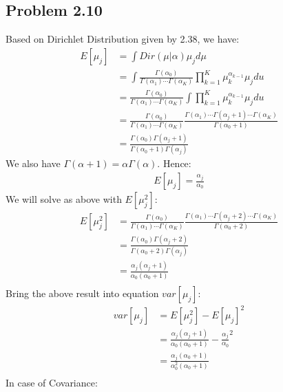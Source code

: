 \documentclass[12pt]{article}
\begin{document}
    \subsection*{Problem 2.10}
    Based on Dirichlet Distribution given by 2.38, we have:
    \begin{align*}
        E[\mu_j] & = \int{Dir(\mu|\alpha)\mu_j}d\mu \\
        & = \int{\frac{\Gamma(\alpha_0)}{\Gamma(\alpha_1)\cdots\Gamma(\alpha_K)}\prod_{k = 1}^{K}\mu_{k}^{\alpha_{k-1}}\mu_jdu} \\
        & = \frac{\Gamma(\alpha_0)}{\Gamma(\alpha_1)\cdots\Gamma(\alpha_K)}\int{\prod_{k = 1}^{K}\mu_{k}^{\alpha_{k-1}}\mu_jdu} \\
        & = \frac{\Gamma(\alpha_0)}{\Gamma(\alpha_1)\cdots\Gamma(\alpha_K)} \frac{\Gamma(\alpha_1)\cdots\Gamma(\alpha_j + 1)\cdots\Gamma(\alpha_K)}{\Gamma(\alpha_0 + 1)} \\
        & = \frac{\Gamma(\alpha_0)\Gamma(\alpha_j + 1)}{\Gamma(\alpha_0 + 1)\Gamma(\alpha_j)}
    \end{align*}
    We also have $\Gamma(\alpha + 1) = \alpha\Gamma(\alpha)$. Hence:
    \begin{align*}
        E[\mu_j] = \frac{\alpha_j}{\alpha_0}
    \end{align*}
    We will solve as above with $E[\mu_j^2]$:
    \begin{align*}
        E[\mu_j^2] & = \frac{\Gamma(\alpha_0)}{\Gamma(\alpha_1)\cdots\Gamma(\alpha_K)} \frac{\Gamma(\alpha_1)\cdots\Gamma(\alpha_j + 2)\cdots\Gamma(\alpha_K)}{\Gamma(\alpha_0 + 2)} \\
        & = \frac{\Gamma(\alpha_0)\Gamma(\alpha_j + 2)}{\Gamma(\alpha_0 + 2)\Gamma(\alpha_j)} \\
        & = \frac{\alpha_j(\alpha_j + 1)}{\alpha_0(\alpha_0 + 1)} \\
    \end{align*}
    Bring the above result into equation $var[\mu_j]$:
    \begin{align*}
        var[\mu_j] & = E[\mu_j^2] - E[\mu_j]^2 \\
        & = \frac{\alpha_j(\alpha_j + 1)}{\alpha_0(\alpha_0 + 1)} - \frac{\alpha_j}{\alpha_0}^2 \\
        & = \frac{\alpha_j(\alpha_0 + 1)}{\alpha_0^2(\alpha_0 + 1)} \\
    \end{align*}
    In case of Covariance:
\end{document}
